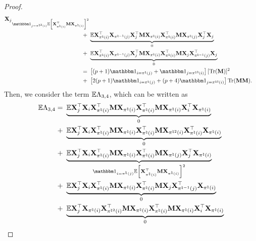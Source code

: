 \documentclass[11pt]{article}
\begin{document}
\begin{proof}
\begin{align}
{\bX_j}_{
\Ind_{j = \pi^{\natural 3}(i)} \Expc \Bracket{\bX_{\pi^{\natural}(i)}^{\rmt}\bM \bX_{\pi^{\natural}(i)} }^2
} \notag \\
+~&
\underbrace{\Expc \bX_{\pi^{\natural}(i)}^{\rmt}
\bX_{\pi^{\natural -1}(j)}\bX_{j}^{\rmt}
\bM \bX_{\pi^{\natural}(i)} \bX_{\pi^{\natural}(i)}^{\rmt} \bM
\bX_{\pi^{\natural}(j)}\bX_{j}^{\rmt}
\bX_j}_{0} \notag \\
+~&
\underbrace{\Expc \bX_{\pi^{\natural}(i)}^{\rmt}
\bX_{\pi^{\natural -1}(j)}\bX_{j}^{\rmt}
\bM \bX_{\pi^{\natural}(i)} \bX_{\pi^{\natural}(i)}^{\rmt} \bM
\bX_{j}\bX_{\pi^{\natural -1}(j)}^{\rmt}
\bX_j}_{0} \notag \\
=~&
\Bracket{ (p+1)\Ind_{i = \pi^{\natural}(j)} + \Ind_{j = \pi^{\natural 3}(i)}} [\trace(\bM)]^2 \notag \\
+~&
\Bracket{2(p+1)\Ind_{i = \pi^{\natural}(j)} + (p+4)\Ind_{j = \pi^{\natural 3}(i)} } \trace(\bM\bM).
\end{align}
Then, we consider the term $\mathbb{E} \Lambda_{3, 4}$, which can be written as
\begin{align}
\label{eq:xione_square_lambda34_dd_expc}	
\Expc \Lambda_{3, 4} =~&
\underbrace{\Expc \bX_j^{\rmt}
\bX_{i}\bX_{\pi^{\natural}(i)}^{\rmt}
\bM
\bX_{\pi^{\natural}(i)} \bX_{\pi^{\natural}(i)}^{\rmt}
\bM
\bX_{\pi^{\natural}(i)}\bX_{i}^{\rmt}
\bX_{\pi^{\natural}(i)}}_{0}  \notag \\
+~& \underbrace{\Expc \bX_j^{\rmt}
\bX_{i}\bX_{\pi^{\natural}(i)}^{\rmt}
\bM
\bX_{\pi^{\natural}(i)} \bX_{\pi^{\natural}(i)}^{\rmt}
\bM
\bX_{\pi^{\natural 2}(i)}\bX_{\pi^{\natural}(i)}^{\rmt}
\bX_{\pi^{\natural}(i)}}_{0} \notag \\
+~& \underbrace{\Expc \bX_j^{\rmt}
\bX_{i}\bX_{\pi^{\natural}(i)}^{\rmt}
\bM
\bX_{\pi^{\natural}(i)} \bX_{\pi^{\natural}(i)}^{\rmt}
\bM
\bX_{\pi^{\natural}(j)}\bX_{j}^{\rmt}
\bX_{\pi^{\natural}(i)}}_{
\Ind_{i = \pi^{\natural}(j)}
\Expc \Bracket{\bX_{\pi^{\natural}(i)}^{\rmt}\bM \bX_{\pi^{\natural}(i)} }^2
} \notag \\
+~& \underbrace{\Expc \bX_j^{\rmt}
\bX_{i}\bX_{\pi^{\natural}(i)}^{\rmt}
\bM
\bX_{\pi^{\natural}(i)} \bX_{\pi^{\natural}(i)}^{\rmt}
\bM
\bX_{j}\bX_{\pi^{\natural -1}(j)}^{\rmt}
\bX_{\pi^{\natural}(i)}}_{0} \notag \\
+~& \underbrace{\Expc \bX_j^{\rmt} %
\bX_{\pi^{\natural}(i)}\bX_{\pi^{\natural 2}(i)}^{\rmt}
\bM
\bX_{\pi^{\natural}(i)} \bX_{\pi^{\natural}(i)}^{\rmt}
\bM
\bX_{\pi^{\natural}(i)}\bX_{i}^{\rmt}
\bX_{\pi^{\natural}(i)}}_{0} \notag \\

\end{align}
\end{proof}
\end{document}

